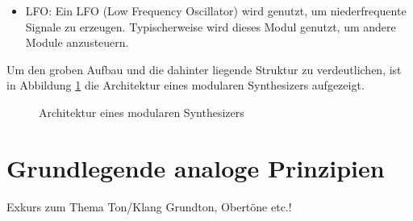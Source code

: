 \begin{itemize}
	\item LFO: \newline
	Ein LFO (Low Frequency Oscillator) wird genutzt, um niederfrequente Signale zu erzeugen.
	Typischerweise wird dieses Modul genutzt, um andere Module anzusteuern.
	
	
\end{itemize}

Um den groben Aufbau und die dahinter liegende Struktur zu verdeutlichen, ist in Abbildung \ref{fig:Produktarchitektur} die Architektur eines modularen Synthesizers aufgezeigt.

\begin{figure}[h]
	\centering
	\setlength{\fboxsep}{1pt} %
	\setlength{\fboxrule}{1pt} %
	\caption{Architektur eines  modularen Synthesizers}
	\label{fig:Produktarchitektur}
\end{figure}


\newpage
\section{Grundlegende analoge Prinzipien}
\label{sec:AnalogePrinzipien}

Exkurs zum Thema Ton/Klang 
Grundton, Obertöne etc.!





